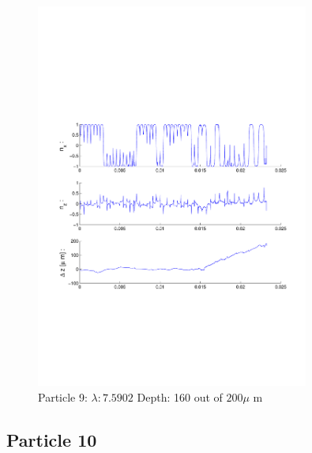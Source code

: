 \begin{figure}[H]

\includegraphics[width=0.8\textwidth]{Images/Particle 9/Particle9.pdf}

\caption{Particle 9:  $ \lambda: 7.5902$ Depth: 160 out of $200 \mu $ m}

\centering

\end{figure}

\subsection{Particle 10}

